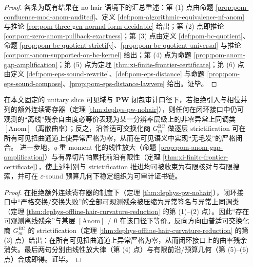 \begin{proof}
各条为既有结果在 no-hair 语境下的汇总重述：第 (1) 点由命题 \ref{prop:pom-confluence-mod-anom-audited}、定义 \ref{def:pom-algorithmic-equivalence-nf-anom} 与推论 \ref{cor:pom-three-gen-normal-form-decidable} 给出；第 (2) 点即推论 \ref{cor:pom-zero-anom-pullback-exactness}；第 (3) 点由定义 \ref{def:pom-bc-quotient}、命题 \ref{prop:pom-bc-quotient-strictify}、\ref{prop:pom-bc-quotient-universal} 与推论 \ref{cor:pom-anom-supported-on-bc-kernel} 给出；第 (4) 点为命题 \ref{prop:pom-anom-gap-amplification}；第 (5) 点为定理 \ref{thm:xi-finite-frontier-certificate}；第 (6) 点由定义 \ref{def:pom-eps-sound-rewrite}、\ref{def:pom-eps-distance} 与命题 \ref{prop:pom-eps-sound-compose}、\ref{prop:pom-eps-distance-lawvere} 给出。证毕。
\end{proof}


\begin{corollary}\label{cor:dephys-offline-hair-iff-curvature}
在本文固定的 unitary slice 可见域与 \(\mathbf{PW}\) 闭包审计口径下，若拒绝引入与相位并列的额外连续寄存器（定理 \ref{thm:dephys-pw-nohair}），则任何在闭环接口中仍可观测的“离线”残余自由度必等价表现为某一分辨率层级上的非零异常上同调类 \([\mathrm{Anom}]\)（离散曲率）；反之，沿普适可交换化商 \(G^{\mathrm{BC}}_m\) 做逐层 strictification 可在所有可见扭曲通道上使异常严格为零，从而在可见语义中实现“无毛发”的严格闭合。
进一步地，\(q\)-重 moment 化的线性放大（命题 \ref{prop:pom-anom-gap-amplification}）与有界切片帕累托前沿有限性（定理 \ref{thm:xi-finite-frontier-certificate}），使上述判别与 strictification 推进均可被收束为有限核对与有限搜索，并可在 \(\varepsilon\)-sound 预算几何下稳定组织为可审计证书链。
\end{corollary}

\begin{proof}
在拒绝额外连续寄存器的制度下（定理 \ref{thm:dephys-pw-nohair}），闭环接口中“严格交换/交换失败”的全部可观测残余被压缩为异常签名与异常上同调类（定理 \ref{thm:dephys-offline-hair-curvature-reduction} 的第 (1)–(2) 点）。因此“存在可观测离线残余”与某层 \([\mathrm{Anom}]\neq 0\) 在该口径下等价。反向方向由普适可交换化商 \(G^{\mathrm{BC}}_m\) 的 strictification（定理 \ref{thm:dephys-offline-hair-curvature-reduction} 的第 (3) 点）给出：在所有可见扭曲通道上异常严格为零，从而闭环接口上的曲率残余消失。最后两句分别由线性放大律（第 (4) 点）与有限前沿/预算几何（第 (5)–(6) 点）合成即得。证毕。
\end{proof}

